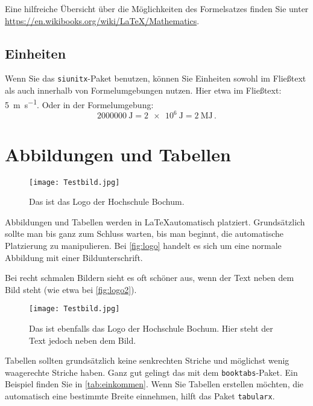 			Eine hilfreiche Übersicht über die Möglichkeiten des Formelsatzes finden Sie unter \url{https://en.wikibooks.org/wiki/LaTeX/Mathematics}. %
		
		
		\subsection{Einheiten}
			Wenn Sie das \texttt{siunitx}-Paket benutzen, können Sie Einheiten sowohl im Fließtext als auch innerhalb von Formelumgebungen nutzen. Hier etwa im Fließtext: \SI{5}{\m\per\s}. Oder in der Formelumgebung: %
			\begin{equation}
				\SI{2000000}{\J} = \SI{2e6}{\J} = \SI{2}{\mega\J} \,. %
			\end{equation}
			
	\section{Abbildungen und Tabellen}
	
		\textcolor{gray}{\lipsum[1]}
	
		\begin{figure}
			\centering
			\texttt{[image: Testbild.jpg]}
			\caption{Das ist das Logo der Hochschule Bochum.}
			\label{fig:logo}
		\end{figure}
		
		Abbildungen und Tabellen werden in \LaTeX automatisch platziert. Grundsätzlich sollte man bis ganz zum Schluss warten, bis man beginnt, die automatische Platzierung zu manipulieren. Bei \autoref{fig:logo} handelt es sich um eine normale Abbildung mit einer Bildunterschrift. %
		
		\textcolor{gray}{\lipsum[1-4]}
		
		Bei recht schmalen Bildern sieht es oft schöner aus, wenn der Text neben dem Bild steht (wie etwa bei \autoref{fig:logo2}). %
		
		\begin{SCfigure}[3]
			\texttt{[image: Testbild.jpg]}
			\caption{Das ist ebenfalls das Logo der Hochschule Bochum. Hier steht der Text jedoch neben dem Bild.}%
			\label{fig:logo2}
		\end{SCfigure}
		
		\textcolor{gray}{\lipsum[1-4]}
		
		Tabellen sollten grundsätzlich keine senkrechten Striche und möglichst wenig waagerechte Striche haben. Ganz gut gelingt das mit dem \texttt{booktabs}-Paket. Ein Beispiel finden Sie in \autoref{tab:einkommen}. Wenn Sie Tabellen erstellen möchten, die automatisch eine bestimmte Breite einnehmen, hilft das Paket \texttt{tabularx}. %
		
